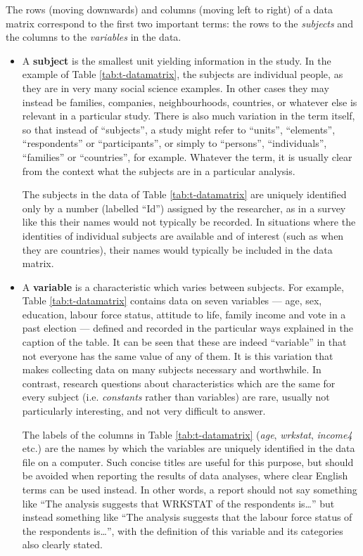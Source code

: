 \documentclass[11pt,a4paper,openany]{book}
\begin{document}
The rows (moving downwards) and columns (moving left to right) of a data
matrix correspond to the first two important terms: the rows to the
\emph{subjects} and the columns to the \emph{variables} in the data.

\begin{itemize}
\item
  A \textbf{subject} is the smallest unit yielding information in the
  study. In the example of Table \ref{tab:t-datamatrix}, the subjects
  are individual people, as they are in very many social science
  examples. In other cases they may instead be families, companies,
  neighbourhoods, countries, or whatever else is relevant in a
  particular study. There is also much variation in the term itself, so
  that instead of ``subjects'', a study might refer to ``units'',
  ``elements'', ``respondents'' or ``participants'', or simply to
  ``persons'', ``individuals'', ``families'' or ``countries'', for
  example. Whatever the term, it is usually clear from the context what
  the subjects are in a particular analysis.

  The subjects in the data of Table \ref{tab:t-datamatrix} are uniquely
  identified only by a number (labelled ``Id'') assigned by the
  researcher, as in a survey like this their names would not typically
  be recorded. In situations where the identities of individual subjects
  are available and of interest (such as when they are countries), their
  names would typically be included in the data matrix.
\item
  A \textbf{variable} is a characteristic which varies between subjects.
  For example, Table \ref{tab:t-datamatrix} contains data on seven
  variables --- age, sex, education, labour force status, attitude to
  life, family income and vote in a past election --- defined and
  recorded in the particular ways explained in the caption of the table.
  It can be seen that these are indeed ``variable'' in that not everyone
  has the same value of any of them. It is this variation that makes
  collecting data on many subjects necessary and worthwhile. In
  contrast, research questions about characteristics which are the same
  for every subject (i.e. \emph{constants} rather than variables) are
  rare, usually not particularly interesting, and not very difficult to
  answer.

  The labels of the columns in Table \ref{tab:t-datamatrix} (\emph{age},
  \emph{wrkstat}, \emph{income4} etc.) are the names by which the
  variables are uniquely identified in the data file on a computer. Such
  concise titles are useful for this purpose, but should be avoided when
  reporting the results of data analyses, where clear English terms can
  be used instead. In other words, a report should not say something
  like ``The analysis suggests that WRKSTAT of the respondents
  is\ldots{}'' but instead something like ``The analysis suggests that
  the labour force status of the respondents is\ldots{}'', with the
  definition of this variable and its categories also clearly stated.
\end{itemize}
\end{document}
